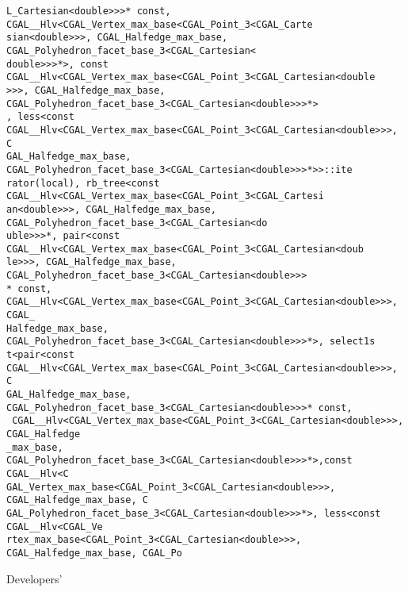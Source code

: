 \begin{titlepage}
\begin{lcTexBlock}
{\verb+L_Cartesian<double>>>* const, CGAL__Hlv<CGAL_Vertex_max_base<CGAL_Point_3<CGAL_Carte+\\
\verb+sian<double>>>, CGAL_Halfedge_max_base, CGAL_Polyhedron_facet_base_3<CGAL_Cartesian<+\\
\verb+double>>>*>, const CGAL__Hlv<CGAL_Vertex_max_base<CGAL_Point_3<CGAL_Cartesian<double+\\
\verb+>>>, CGAL_Halfedge_max_base, CGAL_Polyhedron_facet_base_3<CGAL_Cartesian<double>>>*>+\\
\verb+, less<const CGAL__Hlv<CGAL_Vertex_max_base<CGAL_Point_3<CGAL_Cartesian<double>>>, C+\\
\verb+GAL_Halfedge_max_base, CGAL_Polyhedron_facet_base_3<CGAL_Cartesian<double>>>*>>::ite+\\
\verb+rator(local), rb_tree<const CGAL__Hlv<CGAL_Vertex_max_base<CGAL_Point_3<CGAL_Cartesi+\\
\verb+an<double>>>, CGAL_Halfedge_max_base, CGAL_Polyhedron_facet_base_3<CGAL_Cartesian<do+\\
\verb+uble>>>*, pair<const CGAL__Hlv<CGAL_Vertex_max_base<CGAL_Point_3<CGAL_Cartesian<doub+\\
\verb+le>>>, CGAL_Halfedge_max_base, CGAL_Polyhedron_facet_base_3<CGAL_Cartesian<double>>>+\\
\verb+* const, CGAL__Hlv<CGAL_Vertex_max_base<CGAL_Point_3<CGAL_Cartesian<double>>>, CGAL_+\\
\verb+Halfedge_max_base, CGAL_Polyhedron_facet_base_3<CGAL_Cartesian<double>>>*>, select1s+\\
\verb+t<pair<const CGAL__Hlv<CGAL_Vertex_max_base<CGAL_Point_3<CGAL_Cartesian<double>>>, C+\\
\verb+GAL_Halfedge_max_base, CGAL_Polyhedron_facet_base_3<CGAL_Cartesian<double>>>* const,+\\
\verb+ CGAL__Hlv<CGAL_Vertex_max_base<CGAL_Point_3<CGAL_Cartesian<double>>>, CGAL_Halfedge+\\
\verb+_max_base, CGAL_Polyhedron_facet_base_3<CGAL_Cartesian<double>>>*>,const CGAL__Hlv<C+\\
\verb+GAL_Vertex_max_base<CGAL_Point_3<CGAL_Cartesian<double>>>, CGAL_Halfedge_max_base, C+\\
\verb+GAL_Polyhedron_facet_base_3<CGAL_Cartesian<double>>>*>, less<const CGAL__Hlv<CGAL_Ve+\\
\verb+rtex_max_base<CGAL_Point_3<CGAL_Cartesian<double>>>, CGAL_Halfedge_max_base, CGAL_Po+\\
}
\vspace*{-\textheight}
\end{lcTexBlock}
\vskip4cm
  \vspace{2cm}
  { \lcTex{\color[rgb]{0,0,1}}
    \centerline{{\Huge Developers'}}\vspace{5mm}

}
\end{titlepage}
